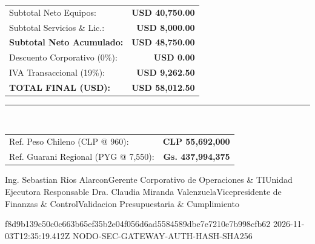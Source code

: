 \documentclass[11pt,a4paper]{article}
\begin{document}
\begin{minipage}[t]{0.44\textwidth}
  \begin{tcolorbox}[
    enhanced,
    colback=white,
    colframe=corpBorder,
    arc=2mm,
    boxrule=0.8pt,
    title={\small\bfseries\color{corpPrimary}LIQUIDACION FINANCIERA FINAL},
    colbacktitle=corpLightBg,
    top=3mm, bottom=3mm, left=4mm, right=4mm
  ]
    \noindent\begin{tabularx}{\linewidth}{@{}Xr@{}}
      {\footnotesize\color{corpTextDark}Subtotal Neto Equipos:} & {\footnotesize\bfseries USD 40,750.00} \\
      {\footnotesize\color{corpTextDark}Subtotal Servicios \& Lic.:} & {\footnotesize\bfseries USD 8,000.00} \\
      \midrule
      {\footnotesize\color{corpTextDark}\textbf{Subtotal Neto Acumulado:}} & {\footnotesize\bfseries USD 48,750.00} \\
      {\footnotesize\color{corpTextDark}Descuento Corporativo (0\%):} & {\footnotesize\bfseries USD 0.00} \\
      {\footnotesize\color{corpTextDark}IVA Transaccional (19\%):} & {\footnotesize\bfseries USD 9,262.50} \\
      \midrule
      {\normalsize\bfseries\color{corpPrimary}TOTAL FINAL (USD):} & {\normalsize\bfseries\color{corpTextAccent}USD 58,012.50} \\
    \end{tabularx}
    \vspace{2mm}
    \hrule
    \vspace{2mm}
    \\[2pt]
    \noindent\begin{tabularx}{\linewidth}{@{}Xr@{}}
      {\scriptsize\color{corpTextMuted}Ref. Peso Chileno (CLP @ 960):} & {\scriptsize\bfseries CLP 55,692,000} \\
      {\scriptsize\color{corpTextMuted}Ref. Guarani Regional (PYG @ 7,550):} & {\scriptsize\bfseries Gs. 437,994,375} \\
    \end{tabularx}
  \end{tcolorbox}
\end{minipage}

\dualcontrolsignature%
  {Ing. Sebastian Rios Alarcon}{Gerente Corporativo de Operaciones \& TI}{Unidad Ejecutora Responsable}%
  {Dra. Claudia Miranda Valenzuela}{Vicepresidente de Finanzas \& Control}{Validacion Presupuestaria \& Cumplimiento}

\vspace{2mm}

\cryptoseal%
  {f8d9b139c50c0c663b65ef35b2e04f056d6ad5584589dbe7e7210e7b998cfb62}%
  {2026-11-03T12:35:19.412Z}%
  {NODO-SEC-GATEWAY-AUTH-HASH-SHA256}
\end{document}
